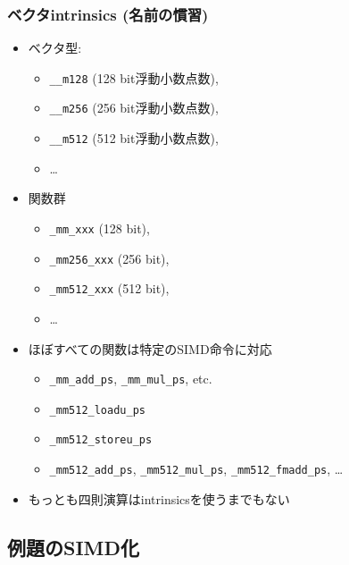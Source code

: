 \documentclass[10pt,dvipdfmx]{beamer}
\begin{document}
\begin{frame}[fragile]
\frametitle{ベクタintrinsics (名前の慣習)}
\begin{itemize}
\item ベクタ型:
  \begin{itemize}
  \item {\tt \_\_m128} (128 bit浮動小数点数), 
  \item {\tt \_\_m256} (256 bit浮動小数点数),
  \item {\tt \_\_m512} (512 bit浮動小数点数),
  \item \ldots 
  \end{itemize}

\item 関数群
  \begin{itemize}
  \item {\tt \_mm\_xxx} (128 bit),
  \item {\tt \_mm256\_xxx} (256 bit),
  \item {\tt \_mm512\_xxx} (512 bit),
  \item \ldots
  \end{itemize}

\item ほぼすべての関数は特定のSIMD命令に対応
  \begin{itemize}
  \item {\tt \_mm\_add\_ps}, {\tt \_mm\_mul\_ps}, etc.
  \item {\tt \_mm512\_loadu\_ps}
  \item {\tt \_mm512\_storeu\_ps}
  \item {\tt \_mm512\_add\_ps}, {\tt \_mm512\_mul\_ps}, {\tt \_mm512\_fmadd\_ps}, \ldots
  \end{itemize}
  
\item もっとも四則演算はintrinsicsを使うまでもない
\end{itemize}
\end{frame}

\iffalse
\subsection{例題のSIMD化}
\end{document}
